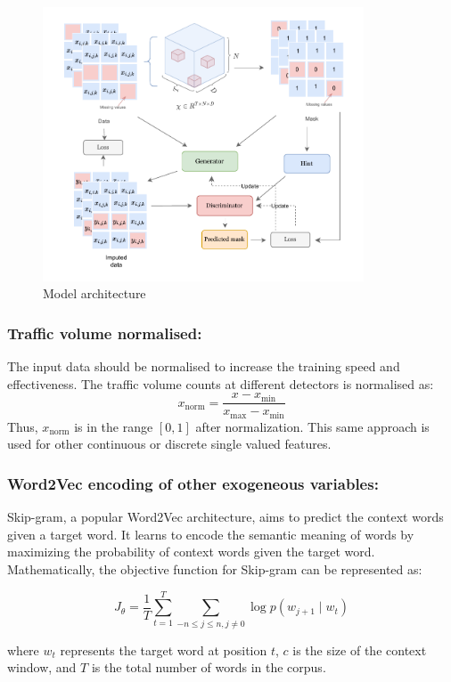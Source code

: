 \documentclass[conference]{IEEEtran}
\begin{document}
\begin{figure}[htbp]
  \centering
  \includegraphics[width=0.85\textwidth]{model.pdf}
  \caption{Model architecture}
  \label{fig:dataset}
\end{figure}

\subsubsection{Traffic volume normalised:}
The input data should be normalised to increase the training speed and effectiveness. The traffic volume counts at different detectors is normalised as:
\[
x_{\text{norm}} = \frac{x - x_{\text{min}}}{x_{\text{max}} - x_{\text{min}}}
\]
Thus, \( x_{\text{norm}} \) is in the range \([0,1]\) after normalization. This same approach is used for other continuous or discrete single valued features.

\subsubsection{Word2Vec encoding of other exogeneous variables:}
Skip-gram\cite{skipgram}, a popular Word2Vec\cite{word2vec} architecture, aims to predict the context words given a target word. It learns to encode the semantic meaning of words by maximizing the probability of context words given the target word. Mathematically, the objective function for Skip-gram can be represented as:

\[
J_\theta = \frac{1}{T}\sum^{T}_{t=1}\sum_{-n\leq j \leq n, j \neq 0}\log p\left(w_{j+1} \mid w_{t}\right)
\]

where \( w_t \) represents the target word at position \( t \), \( c \) is the size of the context window, and \( T \) is the total number of words in the corpus.
\end{document}
